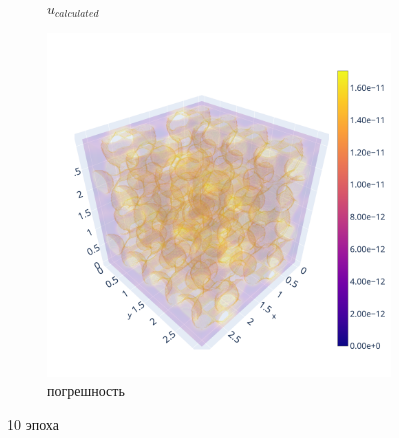 \documentclass[a4paper,hidelinks,12pt]{article}
\begin{document}
\begin{figure}[H]
\begin{subfigure}{.33\textwidth}
  \caption{$u_{calculated}$}
\end{subfigure}%
\begin{subfigure}{.33\textwidth}
  \centering
  \includegraphics[width=\linewidth]{pictures/10_Lpi_128_diff.png}
  \caption{погрешность}
\end{subfigure}%
\caption{10 эпоха}
\label{fig:fig}
\end{figure}
\end{document}
